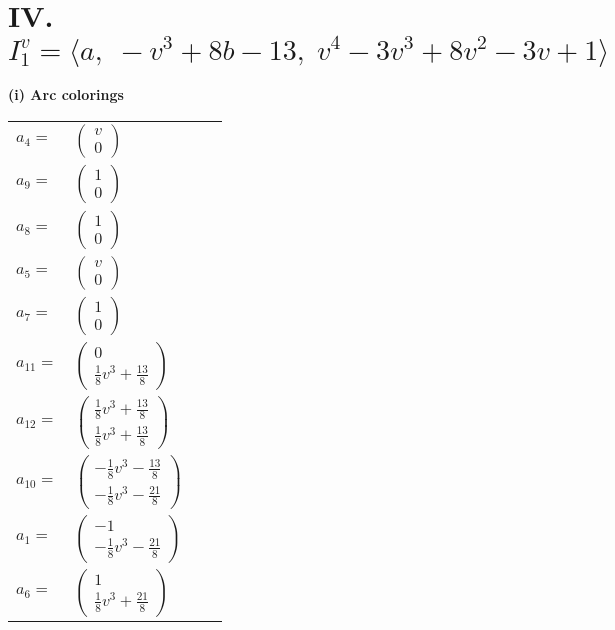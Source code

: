 \documentclass[1p]{elsarticle_modified}
\theoremstyle{definition}
\begin{document}
\centering \section*{IV. $I^v_{1}= \langle a,\;- v^3+8 b-13,\;v^4-3 v^3+8 v^2-3 v+1 \rangle$}
\flushleft \textbf{(i) Arc colorings}\\
\begin{tabular}{m{7pt} m{180pt} m{7pt} m{180pt} }
\flushright $a_{4}=$&$\begin{pmatrix}v\\0\end{pmatrix}$ \\
\flushright $a_{9}=$&$\begin{pmatrix}1\\0\end{pmatrix}$ \\
\flushright $a_{8}=$&$\begin{pmatrix}1\\0\end{pmatrix}$ \\
\flushright $a_{5}=$&$\begin{pmatrix}v\\0\end{pmatrix}$ \\
\flushright $a_{7}=$&$\begin{pmatrix}1\\0\end{pmatrix}$ \\
\flushright $a_{11}=$&$\begin{pmatrix}0\\\frac{1}{8} v^3+\frac{13}{8}\end{pmatrix}$ \\
\flushright $a_{12}=$&$\begin{pmatrix}\frac{1}{8} v^3+\frac{13}{8}\\\frac{1}{8} v^3+\frac{13}{8}\end{pmatrix}$ \\
\flushright $a_{10}=$&$\begin{pmatrix}-\frac{1}{8} v^3-\frac{13}{8}\\-\frac{1}{8} v^3-\frac{21}{8}\end{pmatrix}$ \\
\flushright $a_{1}=$&$\begin{pmatrix}-1\\-\frac{1}{8} v^3-\frac{21}{8}\end{pmatrix}$ \\
\flushright $a_{6}=$&$\begin{pmatrix}1\\\frac{1}{8} v^3+\frac{21}{8}\end{pmatrix}$ \\

\end{tabular}
\end{document}
